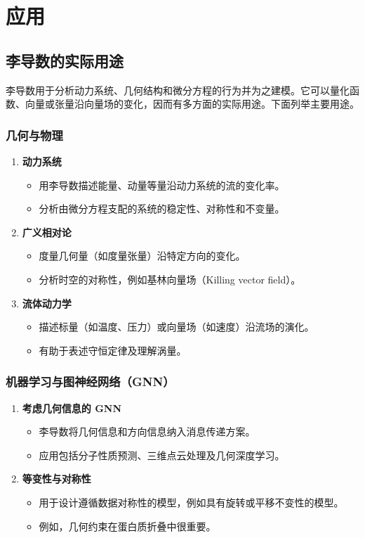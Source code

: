 \section{应用}
\subsection{李导数的实际用途}
李导数用于分析动力系统、几何结构和微分方程的行为并为之建模。它可以量化函数、向量或张量沿向量场的变化，因而有多方面的实际用途。下面列举主要用途。

\subsubsection{几何与物理}
\begin{enumerate}[label=\alph*.]
  \item \textbf{动力系统}
  \begin{itemize}
    \item 用李导数描述能量、动量等量沿动力系统的流的变化率。
    \item 分析由微分方程支配的系统的稳定性、对称性和不变量。
  \end{itemize}
  \item \textbf{广义相对论}
  \begin{itemize}
    \item 度量几何量（如度量张量）沿特定方向的变化。
    \item 分析时空的对称性，例如基林向量场（Killing vector field）。
  \end{itemize}
  \item \textbf{流体动力学}
  \begin{itemize}
    \item 描述标量（如温度、压力）或向量场（如速度）沿流场的演化。
    \item 有助于表述守恒定律及理解涡量。
  \end{itemize}
\end{enumerate}

\subsubsection{机器学习与图神经网络（GNN）}
\begin{enumerate}[label=\alph*.]
  \item \textbf{考虑几何信息的 GNN}
  \begin{itemize}
    \item 李导数将几何信息和方向信息纳入消息传递方案。
    \item 应用包括分子性质预测、三维点云处理及几何深度学习。
  \end{itemize}
  \item \textbf{等变性与对称性}
  \begin{itemize}
    \item 用于设计遵循数据对称性的模型，例如具有旋转或平移不变性的模型。
    \item 例如，几何约束在蛋白质折叠中很重要。
  \end{itemize}
\end{enumerate}

